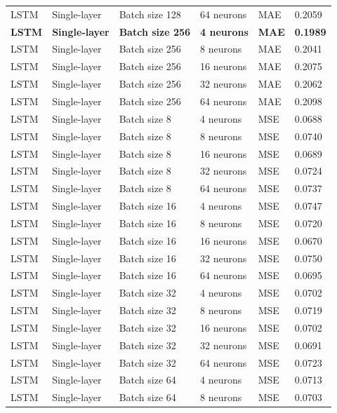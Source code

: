 \begin{landscape}
\begin{longtable}{p{2.2cm}p{3cm}p{3.5cm}p{3.2cm}p{1.6cm}p{1.8cm}}
LSTM & Single-layer & Batch size 128 & 64 neurons & MAE  & 0.2059 \\
\textbf{LSTM} & \textbf{Single-layer} & \textbf{Batch size 256} & \textbf{4 neurons} & \textbf{MAE} & \textbf{0.1989} \\
LSTM & Single-layer & Batch size 256 & 8 neurons  & MAE  & 0.2041 \\
LSTM & Single-layer & Batch size 256 & 16 neurons & MAE  & 0.2075 \\
LSTM & Single-layer & Batch size 256 & 32 neurons & MAE  & 0.2062 \\
LSTM & Single-layer & Batch size 256 & 64 neurons & MAE  & 0.2098 \\

LSTM & Single-layer & Batch size 8   & 4 neurons  & MSE  & 0.0688 \\
LSTM & Single-layer & Batch size 8   & 8 neurons  & MSE  & 0.0740 \\
LSTM & Single-layer & Batch size 8   & 16 neurons & MSE  & 0.0689 \\
LSTM & Single-layer & Batch size 8   & 32 neurons & MSE  & 0.0724 \\
LSTM & Single-layer & Batch size 8   & 64 neurons & MSE  & 0.0737 \\
LSTM & Single-layer & Batch size 16  & 4 neurons  & MSE  & 0.0747 \\
LSTM & Single-layer & Batch size 16  & 8 neurons  & MSE  & 0.0720 \\
LSTM & Single-layer & Batch size 16  & 16 neurons & MSE  & 0.0670 \\
LSTM & Single-layer & Batch size 16  & 32 neurons & MSE  & 0.0750 \\
LSTM & Single-layer & Batch size 16  & 64 neurons & MSE  & 0.0695 \\
LSTM & Single-layer & Batch size 32  & 4 neurons  & MSE  & 0.0702 \\
LSTM & Single-layer & Batch size 32  & 8 neurons  & MSE  & 0.0719 \\
LSTM & Single-layer & Batch size 32  & 16 neurons & MSE  & 0.0702 \\
LSTM & Single-layer & Batch size 32  & 32 neurons & MSE  & 0.0691 \\
LSTM & Single-layer & Batch size 32  & 64 neurons & MSE  & 0.0723 \\
LSTM & Single-layer & Batch size 64  & 4 neurons  & MSE  & 0.0713 \\
LSTM & Single-layer & Batch size 64  & 8 neurons  & MSE  & 0.0703 \\

\end{longtable}
\end{landscape}
